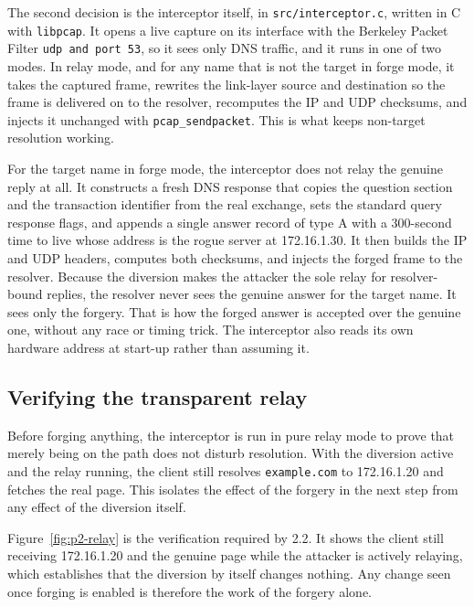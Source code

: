 \documentclass[11pt]{article}
\begin{document}
The second decision is the interceptor itself, in \texttt{src/interceptor.c},
written in C with \texttt{libpcap}. It opens a live capture on its interface with
the Berkeley Packet Filter \texttt{udp and port 53}, so it sees only DNS traffic,
and it runs in one of two modes. In relay mode, and for any name that is not the
target in forge mode, it takes the captured frame, rewrites the link-layer source
and destination so the frame is delivered on to the resolver, recomputes the IP
and UDP checksums, and injects it unchanged with \texttt{pcap\_sendpacket}. This
is what keeps non-target resolution working.

For the target name in forge mode, the interceptor does not relay the genuine
reply at all. It constructs a fresh DNS response that copies the question section
and the transaction identifier from the real exchange, sets the standard query
response flags, and appends a single answer record of type A with a 300-second
time to live whose address is the rogue server at 172.16.1.30. It then builds the
IP and UDP headers, computes both checksums, and injects the forged frame to the
resolver. Because the diversion makes the attacker the sole relay for
resolver-bound replies, the resolver never sees the genuine answer for the target
name. It sees only the forgery. That is how the forged answer is accepted over the
genuine one, without any race or timing trick. The interceptor also reads its own
hardware address at start-up rather than assuming it.

\subsection{Verifying the transparent relay}

Before forging anything, the interceptor is run in pure relay mode to prove that
merely being on the path does not disturb resolution. With the diversion active
and the relay running, the client still resolves \texttt{example.com} to
172.16.1.20 and fetches the real page. This isolates the effect of the forgery in
the next step from any effect of the diversion itself.


Figure~\ref{fig:p2-relay} is the verification required by 2.2.
It shows the client still receiving 172.16.1.20 and the genuine page while
the attacker is actively relaying, which establishes that the diversion by itself
changes nothing. Any change seen once forging is enabled is therefore the work of
the forgery alone.
\end{document}
